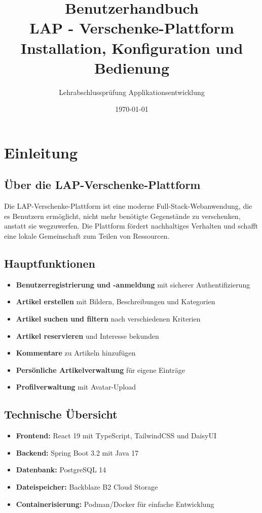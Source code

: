 \documentclass[a4paper,12pt]{article}
\title{
    \huge\textbf{Benutzerhandbuch}\\
    \Large LAP - Verschenke-Plattform\\
    \large Installation, Konfiguration und Bedienung
}
\author{Lehrabschlussprüfung Applikationsentwicklung}
\date{\today}
\begin{document}
\maketitle

\newpage

\tableofcontents

\newpage

\section{Einleitung}

\subsection{Über die LAP-Verschenke-Plattform}
Die LAP-Verschenke-Plattform ist eine moderne Full-Stack-Webanwendung, die es Benutzern ermöglicht, nicht mehr benötigte Gegenstände zu verschenken, anstatt sie wegzuwerfen. Die Plattform fördert nachhaltiges Verhalten und schafft eine lokale Gemeinschaft zum Teilen von Ressourcen.

\subsection{Hauptfunktionen}
\begin{itemize}
    \item \textbf{Benutzerregistrierung und -anmeldung} mit sicherer Authentifizierung
    \item \textbf{Artikel erstellen} mit Bildern, Beschreibungen und Kategorien
    \item \textbf{Artikel suchen und filtern} nach verschiedenen Kriterien
    \item \textbf{Artikel reservieren} und Interesse bekunden
    \item \textbf{Kommentare} zu Artikeln hinzufügen
    \item \textbf{Persönliche Artikelverwaltung} für eigene Einträge
    \item \textbf{Profilverwaltung} mit Avatar-Upload
\end{itemize}

\subsection{Technische Übersicht}
\begin{itemize}
    \item \textbf{Frontend:} React 19 mit TypeScript, TailwindCSS und DaisyUI
    \item \textbf{Backend:} Spring Boot 3.2 mit Java 17
    \item \textbf{Datenbank:} PostgreSQL 14
    \item \textbf{Dateispeicher:} Backblaze B2 Cloud Storage
    \item \textbf{Containerisierung:} Podman/Docker für einfache Entwicklung
\end{itemize}
\end{document}

